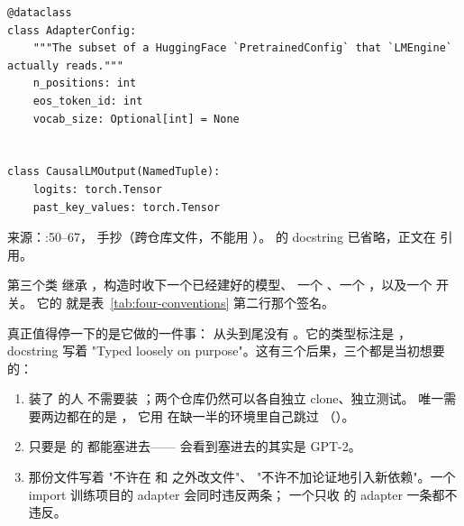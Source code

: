 \begin{lstlisting}[style=hlplain]
@dataclass
class AdapterConfig:
    """The subset of a HuggingFace `PretrainedConfig` that `LMEngine` actually reads."""
    n_positions: int
    eos_token_id: int
    vocab_size: Optional[int] = None


class CausalLMOutput(NamedTuple):
    logits: torch.Tensor
    past_key_values: torch.Tensor
\end{lstlisting}
\noindent 来源：:50--67，
手抄（跨仓库文件，不能用 ）。
的 docstring 已省略，正文在  引用。

第三个类  继承 ，构造时收下一个已经建好的模型、
一个 、一个 ，以及一个  开关。
它的  就是表~\ref{tab:four-conventions} 第二行那个签名。

真正值得停一下的是它做的一件事：
从头到尾没有 。它的类型标注是 ，
docstring 写着 "Typed loosely on purpose"。这有三个后果，三个都是当初想要的：

\begin{enumerate}[label=(\arabic*), leftmargin=1.8em]
  \item {} 装了  的人
        不需要装 ；两个仓库仍然可以各自独立 clone、独立测试。
        唯一需要两边都在的是 ，
        它用  在缺一半的环境里自己跳过
        （）。
  \item {} 只要是  的
         都能塞进去—— 会看到塞进去的其实是 GPT-2。
  \item {} 那份文件写着
        "不许在  和  之外改文件"、
        "不许不加论证地引入新依赖"。一个 import 训练项目的 adapter 会同时违反两条；
        一个只收  的 adapter 一条都不违反。
\end{enumerate}

